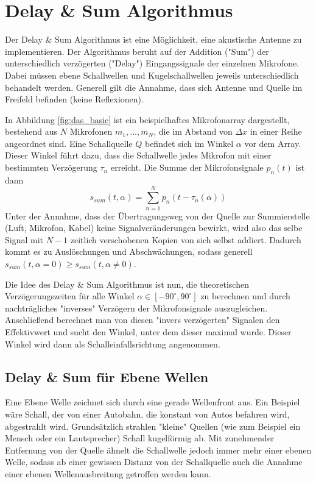 \section{Delay \& Sum Algorithmus}

	Der Delay \& Sum Algorithmus ist eine Möglichkeit, eine akustische Antenne zu implementieren. Der Algorithmus beruht auf der Addition ("Sum") der unterschiedlich verzögerten ("Delay") Eingangssignale der einzelnen Mikrofone. Dabei müssen ebene Schallwellen und Kugelschallwellen jeweils unterschiedlich behandelt werden. Generell gilt die Annahme, dass sich Antenne und Quelle im Freifeld befinden (keine Reflexionen).
	
	In Abbildung \ref{fig:das_basic} ist ein beispielhaftes Mikrofonarray dargestellt, bestehend aus $N$ Mikrofonen $m_1,...,m_N$, die im Abstand von $\Delta x$ in einer Reihe angeordnet sind. Eine Schallquelle $Q$ befindet sich im Winkel $\alpha$ vor dem Array.
	Dieser Winkel führt dazu, dass die Schallwelle jedes Mikrofon mit einer bestimmten Verzögerung $\tau_n$ erreicht.
	Die Summe der Mikrofonsignale $p_n(t)$ ist dann
	\begin{equation}
		s_{sum}(t, \alpha) = \sum_{n=1}^{N} p_n(t - \tau_n(\alpha))
	\end{equation}
	Unter der Annahme, dass der Übertragungsweg von der Quelle zur Summierstelle (Luft, Mikrofon, Kabel) keine Signalveränderungen bewirkt, wird also das selbe Signal mit $N-1$ zeitlich verschobenen Kopien von sich selbst addiert.
	Dadurch kommt es zu Auslöschungen und Abschwächungen, sodass generell $s_{sum}(t, \alpha=0) \ge s_{sum}(t, \alpha \ne 0)$.
	
	Die Idee des Delay \& Sum Algorithmus ist nun, die theoretischen Verzögerungszeiten für alle Winkel $\alpha \in [-90^{\circ}, 90^{\circ}]$ zu berechnen und durch nachträgliches "inverses" Verzögern der Mikrofonsignale auszugleichen.
	Anschließend berechnet man von diesen "invers verzögerten" Signalen den Effektivwert und sucht den Winkel, unter dem dieser maximal wurde.
	Dieser Winkel wird dann als Schalleinfallsrichtung angenommen.

\subsection{Delay \& Sum für Ebene Wellen}
	
	Eine Ebene Welle zeichnet sich durch eine gerade Wellenfront aus.
	Ein Beispiel wäre Schall, der von einer Autobahn, die konstant von Autos befahren wird, abgestrahlt wird.
	Grundsätzlich strahlen "kleine" Quellen (wie zum Beispiel ein Mensch oder ein Lautsprecher) Schall kugelförmig ab. Mit zunehmender Entfernung von der Quelle ähnelt die Schallwelle jedoch immer mehr einer ebenen Welle, sodass ab einer gewissen Distanz von der Schallquelle auch die Annahme einer ebenen Wellenausbreitung getroffen werden kann.
	
